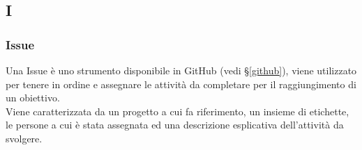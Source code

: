 \subsection{I}

\subsubsection{Issue}
Una Issue è uno strumento disponibile in GitHub (vedi \S\ref{github}), viene
utilizzato per tenere in ordine e assegnare le attività da completare per il
raggiungimento di un obiettivo.\\
Viene caratterizzata da un progetto a cui fa riferimento, un insieme di
etichette, le persone a cui è stata assegnata ed una descrizione esplicativa
dell'attività da svolgere.

\newpage
